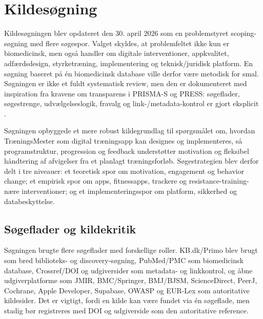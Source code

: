\section{Kildesøgning}
\sloppy

Kildesøgningen blev opdateret den 30. april 2026 som en problemstyret scoping-søgning med flere søgespor. Valget skyldes, at problemfeltet ikke kun er biomedicinsk, men også handler om digitale interventioner, appkvalitet, adfærdsdesign, styrketræning, implementering og teknisk/juridisk platform. En søgning baseret på én biomedicinsk database ville derfor være metodisk for smal. Søgningen er ikke et fuldt systematisk review, men den er dokumenteret med inspiration fra kravene om transparens i PRISMA-S og PRESS: søgeflader, søgestrenge, udvælgelseslogik, fravalg og link-/metadata-kontrol er gjort eksplicit \cite{rethlefsen2021_prisma_s,mcgowan2016_press_guideline_statement}.

Søgningen opbyggede et mere robust kildegrundlag til spørgsmålet om, hvordan TræningsMester som digital træningsapp kan designes og implementeres, så programstruktur, progression og feedback understøtter motivation og fleksibel håndtering af afvigelser fra et planlagt træningsforløb. Søgestrategien blev derfor delt i tre niveauer: et teoretisk spor om motivation, engagement og behavior change; et empirisk spor om apps, fitnessapps, trackere og resistance-training-nære interventioner; og et implementeringsspor om platform, sikkerhed og databeskyttelse.

\subsection{Søgeflader og kildekritik}

Søgningen brugte flere søgeflader med forskellige roller. KB.dk/Primo blev brugt som bred biblioteks- og discovery-søgning, PubMed/PMC som biomedicinsk database, Crossref/DOI og udgiversider som metadata- og linkkontrol, og åbne udgiverplatforme som JMIR, BMC/Springer, BMJ/BJSM, ScienceDirect, PeerJ, Cochrane, Apple Developer, Supabase, OWASP og EUR-Lex som autoritative kildesider. Det er vigtigt, fordi en kilde kan være fundet via én søgeflade, men stadig bør registreres med DOI og udgiverside som den autoritative reference.

